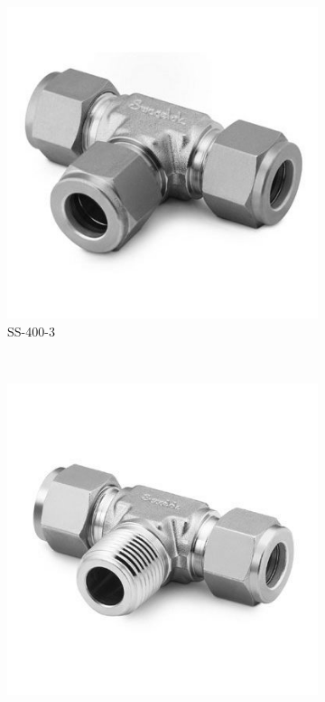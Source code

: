 \begin{figure}[H]
    \centering
    \begin{subfigure}[b]{0.21\textwidth}
    \centering
    \includegraphics[width=\textwidth]{appendix/img/interfaces/SS-400-3.jpg}
    \caption{SS-400-3}
    \end{subfigure}
    ~
    \begin{subfigure}[b]{0.21\textwidth}
    \centering
    \includegraphics[width=\textwidth]{appendix/img/interfaces/SS-400-3-4TTM.jpg}

\end{subfigure}
\end{figure}
